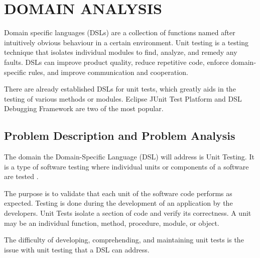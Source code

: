\chapter{DOMAIN ANALYSIS}

Domain specific languages (DSLs) are a collection of functions named after intuitively obvious behaviour in a certain environment. Unit testing is a testing technique that isolates individual modules to find, analyze, and remedy any faults. DSLs can improve product quality, reduce repetitive code, enforce domain-specific rules, and improve communication and cooperation.

There are already established DSLs for unit tests, which greatly aids in the testing of various methods or modules. Eclipse JUnit Test Platform and DSL Debugging Framework are two of the most popular. 



\section{Problem Description and Problem Analysis}

The domain the Domain-Specific Language (DSL) will address is Unit Testing. It  is a type of software testing where individual units or components of a software are tested \cite{techtarget}.

 The purpose is to validate that each unit of the software code performs as expected. Testing is done during the development of an application by the developers. Unit Tests isolate a section of code and verify its correctness. A unit may be an individual function, method, procedure, module, or object.

 The difficulty of developing, comprehending, and maintaining unit tests is the issue with unit testing that a DSL can address.


